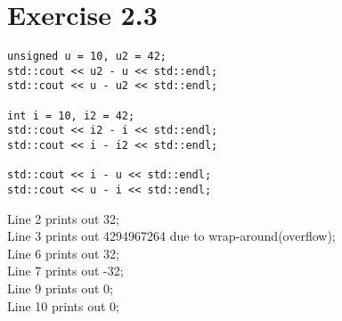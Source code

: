 \documentclass{article}
\begin{document}
\section*{Exercise 2.3}

\begin{lstlisting}
unsigned u = 10, u2 = 42;
std::cout << u2 - u << std::endl; 
std::cout << u - u2 << std::endl; 
    
int i = 10, i2 = 42; 
std::cout << i2 - i << std::endl; 
std::cout << i - i2 << std::endl; 
    
std::cout << i - u << std::endl; 
std::cout << u - i << std::endl;
\end{lstlisting}

\begin{flushleft}
Line 2 prints out 32;                                       \\
Line 3 prints out 4294967264 due to wrap-around(overflow);  \\
Line 6 prints out 32;                                       \\
Line 7 prints out -32;                                      \\
Line 9 prints out 0;                                        \\
Line 10 prints out 0;
\end{flushleft}
\end{document}
